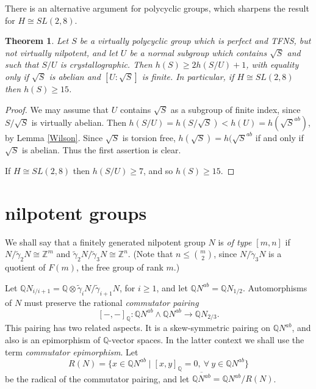 \documentclass[12pt]{amsart}
\renewcommand{\geq}{\geqslant}
\renewcommand{\leq}{\leqslant}
\newtheorem{theorem}{Theorem}
\begin{document}
There is an alternative argument for polycyclic groups, 
which sharpens the result for $H\cong{SL(2,8)}$.

\begin{theorem}
\label{vpcnonvnil}
Let $S$ be a virtually polycyclic group which is perfect and TFNS,
but not virtually nilpotent, and let $U$ be a normal subgroup which contains $\sqrt {S}$ 
and such that $S/U$ is crystallographic.
Then $h(S)\geq2h(S/U)+1$, 
with equality only if $\sqrt{S}$ is abelian and $[U:\sqrt{S}]$ is finite.
In particular,
if $H\cong{SL(2,8)}$ then $h(S)\geq15$.
\end{theorem}

\begin{proof}
We may assume that $U$ contains $\sqrt{S}$ as a subgroup of finite index,
since $S/\sqrt{S}$ is virtually abelian.
Then $h(S/U)=h(S/\sqrt{S})<h(U)=h(\sqrt{S}^{ab})$, by Lemma \ref{Wilson}. 
Since $\sqrt{S}$ is torsion free,
$h(\sqrt{S})=h(\sqrt{S}^{ab}$ if and only if $\sqrt{S}$ is abelian.
Thus the first assertion is clear.

If $H\cong{SL(2,8)}$ then $h(S/U)\geq7$,  and so $h(S)\geq15$.
\end{proof}

\section{nilpotent groups}

We shall say that  a finitely generated nilpotent group $N$
 is {\it of type $[m,n]$} if 
$N/\tilde\gamma_2N\cong\mathbb{Z}^m$ and 
$\tilde\gamma_2N/\tilde\gamma_3N\cong\mathbb{Z}^n$.
(Note that $n\leq\binom{m}2$, since $N/\tilde\gamma_3N$
is a quotient of $F(m)$,  the free group of rank $m$.)

Let $\mathbb{Q}N_{i/i+1}=\mathbb{Q}\otimes\tilde\gamma_iN/\tilde\gamma_{i+1}N$,
for $i\geq1$, 
and let $\mathbb{Q}N^{ab}=\mathbb{Q}N_{1/2}$.
Automorphisms of $N$ must preserve the rational {\it commutator pairing}
\[
[-,-]_\mathbb{Q}:\mathbb{Q}N^{ab}\wedge\mathbb{Q}N^{ab}\to
\mathbb{Q}N_{2/3}.
\]
This pairing has two related aspects.
It is a skew-symmetric pairing on $\mathbb{Q}N^{ab}$, 
and also is an epimorphism of $\mathbb{Q}$-vector spaces.
In the latter context we shall use the term {\it commutator epimorphism\/}.
Let 
\[
R(N)=
\{x\in\mathbb{Q}N^{ab}\mid[x,y]_\mathbb{Q}=0,~\forall~y\in\mathbb{Q}N^{ab} \}
\]
be the radical of the commutator pairing,
and let $\overline{\mathbb{Q}N^{ab}}=\mathbb{Q}N^{ab}/R(N)$.
\end{document}
